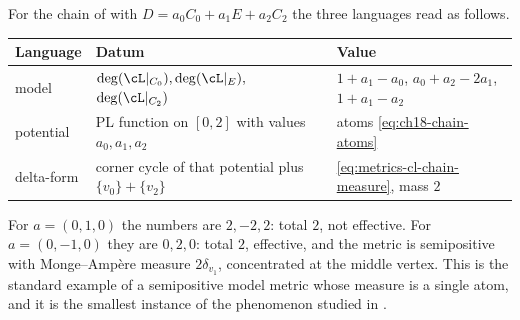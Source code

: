 \begin{example}
\label{ex:ch18-compare-chain}
For the chain of  with
$D=a_0C_0+a_1E+a_2C_2$ the three languages read as follows.
\begin{center}
\small
\begin{tabular}{p{}|p{}|p{}}
\textbf{Language}&\textbf{Datum}&\textbf{Value}\\ \hline
model
 &$\deg(\cL|_{C_0}),\deg(\cL|_E),$\newline
   $\deg(\cL|_{C_2})$
 &$1+a_1-a_0$, $a_0+a_2-2a_1$, $1+a_1-a_2$\\
potential
 &PL function on $[0,2]$ with values $a_0,a_1,a_2$
 &atoms \eqref{eq:ch18-chain-atoms}\\
delta-form
 &corner cycle of that potential plus $\{v_0\}+\{v_2\}$
 &\eqref{eq:metrics-cl-chain-measure}, mass $2$\\
\end{tabular}
\end{center}
For $a=(0,1,0)$ the numbers are $2,-2,2$: total $2$, not effective.  For
$a=(0,-1,0)$ they are $0,2,0$: total $2$, effective, and the metric is
semipositive with Monge--Amp\`ere measure $2\delta_{v_1}$, concentrated at
the middle vertex.  This is the standard example of a semipositive model
metric whose measure is a single atom, and it is the smallest instance of
the phenomenon studied in .
\end{example}

